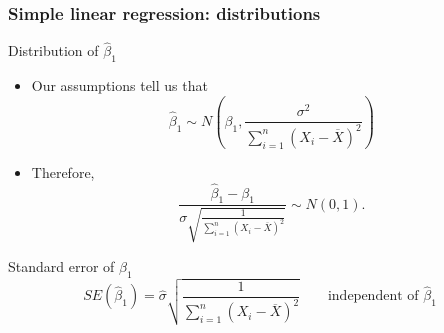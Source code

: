 \documentclass[handout]{beamer}
\begin{document}

   \begin{frame} \frametitle{Simple linear regression: distributions}

   \begin{block}
   {Distribution of $\widehat{\beta}_1$}
   \begin{itemize}

   \item Our assumptions tell us that
   $$
   \widehat{\beta}_1 \sim N\left(\beta_1, \frac{\sigma^2}{\sum_{i=1}^n(X_i-\overline{X})^2}\right)$$

   \item Therefore,
   $$\frac{\widehat{\beta}_1 - \beta_1}{\sigma \sqrt{\frac{1}{\sum_{i=1}^n(X_i-\overline{X})^2}}} \sim N(0,1).$$

   \end{itemize}
   \end{block}
   \begin{block}
   {Standard error of $\widehat{\beta}_1$}
   $$
   SE(\widehat{\beta}_1) = \widehat{\sigma} \sqrt{\frac{1}{\sum_{i=1}^n(X_i-\overline{X})^2}} \qquad \text{independent of $\widehat{\beta}_1$}$$

   \end{block}
   \end{frame}

\end{document}
